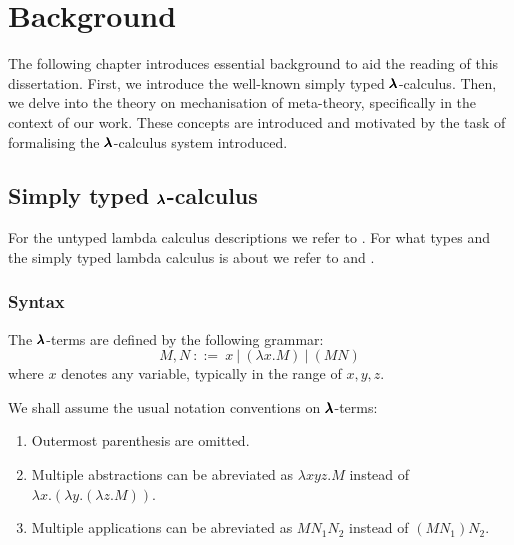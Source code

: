 \chapter{Background}
\label{c:background}


The following chapter introduces essential background to aid the reading of this dissertation.
First, we introduce the well-known simply typed $\pmb{\lambda}$-calculus.
Then, we delve into the theory on mechanisation of meta-theory, specifically in the context of our work.
These concepts are introduced and motivated by the task of formalising the $\pmb{\lambda}$-calculus system introduced.

\section{Simply typed $\pmb{\lambda}$-calculus}

For the untyped lambda calculus descriptions we refer to \cite{Barendregt1987}.
For what types and the simply typed lambda calculus is about we refer to \cite{Barendregt2013} and \cite{Hindley1997}.

\subsection{Syntax}

\begin{definition}
  The $\pmb{\lambda}$-terms are defined by the following grammar:
  \[ M, N \ ::= \ x \ | \ (\lambda x . M) \ | \ (M N) \]
  where $x$ denotes any variable, typically in the range of $x, y, z$.
\end{definition}

\begin{notation}
  We shall assume the usual notation conventions on $\pmb{\lambda}$-terms:

  \begin{enumerate}
  \item Outermost parenthesis are omitted.
  \item Multiple abstractions can be abreviated as $\lambda x y z . M$ instead of  $\lambda x . (\lambda y . (\lambda z . M))$.
  \item Multiple applications can be abreviated as $M N_1 N_2$ instead of $(M N_1) N_2$.
  \end{enumerate}
\end{notation}

